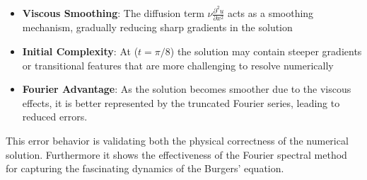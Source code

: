 \begin{itemize}
	\item \textbf{Viscous Smoothing}: The diffusion term $\nu\frac{\partial^2 u}{\partial x^2}$ acts as a smoothing mechanism, gradually reducing sharp gradients in the solution
	\item \textbf{Initial Complexity}: At ($t = \pi/8$) the solution may contain steeper gradients or transitional features that are more challenging to resolve numerically
	\item \textbf{Fourier Advantage}: As the solution becomes smoother due to the viscous effects, it is better represented by the truncated Fourier series, leading to reduced errors.
\end{itemize}
%
This error behavior is validating both the physical correctness of the numerical solution. Furthermore it shows the effectiveness of the Fourier spectral method for capturing the fascinating dynamics of the Burgers' equation.

